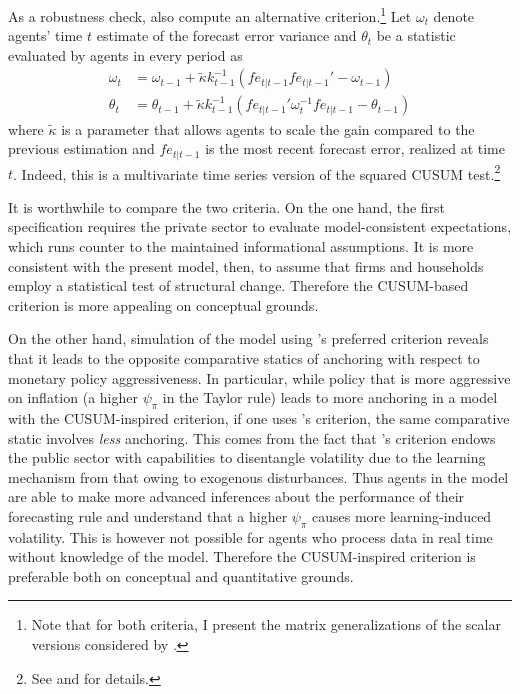 \documentclass[11pt]{article}
\renewcommand{\[}{\begin{equation}}
\renewcommand{\]}{\end{equation}}
\begin{document}
As a robustness check, \cite{carvalho2019anchored} also compute an alternative criterion.\footnote{Note that for both criteria, I present the matrix generalizations of the scalar versions considered by \cite{carvalho2019anchored}.} Let $\omega_t$ denote agents' time $t$ estimate of the forecast error variance and $\theta_t$ be a statistic evaluated by agents in every period as
\begin{align}
\omega_t & =  \omega_{t-1} + \tilde{\kappa} k_{t-1}^{-1}(fe_{t|t-1} fe_{t|t-1}'  -\omega_{t-1})\\
\theta_t & =  \theta_{t-1} + \tilde{\kappa} k_{t-1}^{-1}(fe_{t|t-1}'\omega_t^{-1}fe_{t|t-1} -\theta_{t-1}) \label{cusum_crit}
\end{align}
where $\tilde{\kappa}$ is a parameter that allows agents to scale the gain compared to the previous estimation and $fe_{t|t-1}$ is the most recent forecast error, realized at time $t$. Indeed, this is a multivariate time series version of the squared CUSUM test.\footnote{See \cite{brown1975techniques} and \cite{lutkepohl2013introduction} for details.}

It is worthwhile to compare the two criteria. On the one hand, the first specification requires the private sector to evaluate model-consistent expectations, which runs counter to the maintained informational assumptions. It is more consistent with the present model, then, to assume that firms and households employ a statistical test of structural change. Therefore the CUSUM-based criterion is more appealing on conceptual grounds.

On the other hand, simulation of the model using \cite{carvalho2019anchored}'s preferred criterion reveals that it leads to the opposite comparative statics of anchoring with respect to monetary policy aggressiveness. In particular, while policy that is more aggressive on inflation (a higher $\psi_{\pi}$ in the Taylor rule) leads to more anchoring in a model with the CUSUM-inspired criterion, if one uses \cite{carvalho2019anchored}'s criterion, the same comparative static involves \emph{less} anchoring. This comes from the fact that \cite{carvalho2019anchored}'s criterion endows the public sector with capabilities to disentangle volatility due to the learning mechanism from that owing to exogenous disturbances. Thus agents in the \cite{carvalho2019anchored} model are able to make more advanced inferences about the performance of their forecasting rule and understand that a higher $\psi_{\pi}$ causes more learning-induced volatility. This is however not possible for agents who process data in real time without knowledge of the model. Therefore the CUSUM-inspired criterion is preferable both on conceptual and quantitative grounds.
\end{document}
